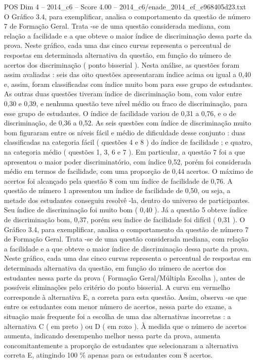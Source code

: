 \begin{textsample}{POS Dim 4 – 2014\_c6 – Score 4.00 – 2014\_c6/enade\_2014\_ef\_e968405d23.txt}
O Gráfico 3.4, para exemplificar, analisa o comportamento da questão de número 7 de Formação Geral.
Trata -se de uma questão considerada mediana, com relação a facilidade e a que obteve o maior índice de discriminação dessa parte da prova.
Neste gráfico, cada uma das cinco curvas representa o percentual de respostas em determinada alternativa da questão, em função do número de acertos dos discriminação ( ponto bisserial ).
Nesta análise, as questões foram assim avaliadas : seis das oito questões apresentaram índice acima ou igual a 0,40 e, assim, foram classificadas com índice muito bom para esse grupo de estudantes.
As outras duas questões tiveram índice de discriminação bom, com valor entre 0,30 e 0,39, e nenhuma questão teve nível médio ou fraco de discriminação, para esse grupo de estudantes.
O índice de facilidade variou de 0,31 a 0,76, e o de discriminação, de 0,36 a 0,52.
As seis questões com índice de discriminação muito bom figuraram entre os níveis fácil e médio de dificuldade desse conjunto : duas classificadas na categoria fácil ( questões 4 e 8 ) do índice de facilidade ; e quatro, na categoria médio ( questões 1, 3, 6 e 7 ).
Em particular, a questão 7 foi a que apresentou o maior poder discriminatório, com índice 0,52, porém foi considerada médio em termos de facilidade, com uma proporção de 0,44 acertos.
O máximo de acertos foi alcançado pela questão 8 com um índice de facilidade de 0,76.
A questão de número 1 apresentou um índice de facilidade de 0,50, ou seja, a metade dos estudantes conseguiu resolvê -la, dentro do universo de participantes.
Seu índice de discriminação foi muito bom ( 0,40 ).
Já a questão 5 obteve índice de discriminação bom, 0,37, porém seu índice de facilidade foi difícil ( 0,31 ).
O Gráfico 3.4, para exemplificar, analisa o comportamento da questão de número 7 de Formação Geral.
Trata -se de uma questão considerada mediana, com relação a facilidade e a que obteve o maior índice de discriminação dessa parte da prova.
Neste gráfico, cada uma das cinco curvas representa o percentual de respostas em determinada alternativa da questão, em função do número de acertos dos estudantes nessa parte da prova ( Formação Geral/Múltipla Escolha ), antes de possíveis eliminações pelo critério do ponto bisserial.
A curva em vermelho corresponde à alternativa E, a correta para esta questão.
Assim, observa -se que entre os estudantes com menor número de acertos, nessa parte do exame, a situação mais frequente foi a escolha de uma das alternativas incorretas : a alternativa C ( em preto ) ou D ( em roxo ).
À medida que o número de acertos aumenta, indicando desempenho melhor nessa parte da prova, aumenta concomitantemente a proporção de estudantes que selecionaram a alternativa correta E, atingindo 100 \% apenas para os estudantes com 8 acertos.

\end{textsample}
